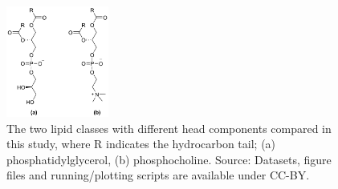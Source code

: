 \documentclass[twoside,twocolumn,9pt]{article}
\begin{document}
\begin{figure}
	\centering
	\includegraphics[width=0.30\textwidth]{figures/head_groups}
	\caption{The two lipid classes with different head components compared in this study, where R indicates the hydrocarbon tail; (a) phosphatidylglycerol, (b) phosphocholine. Source: Datasets, figure files and running/plotting scripts are available under CC-BY.\cite{mccluskey_2018}}
	\label{fig:heads}
\end{figure}
\end{document}
